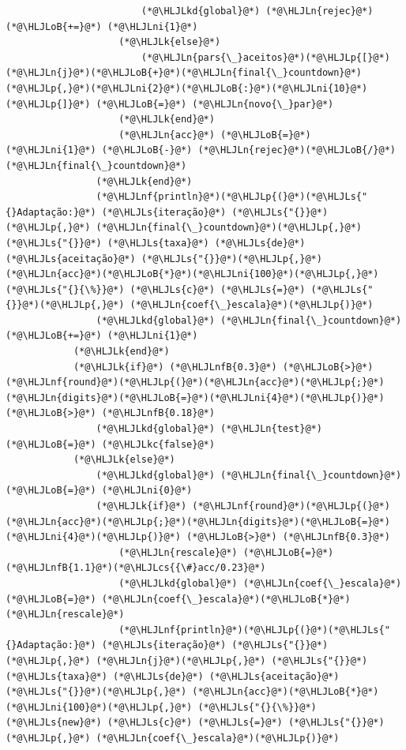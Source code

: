 \documentclass[12pt,a4paper]{article}
\newcommand{\HLJLk}[1]{\textcolor[RGB]{148,91,176}{\textbf{#1}}}
\newcommand{\HLJLkc}[1]{\textcolor[RGB]{59,151,46}{\textit{#1}}}
\newcommand{\HLJLkd}[1]{\textcolor[RGB]{214,102,97}{\textit{#1}}}
\newcommand{\HLJLn}[1]{#1}
\newcommand{\HLJLnf}[1]{\textcolor[RGB]{66,102,213}{#1}}
\newcommand{\HLJLs}[1]{\textcolor[RGB]{201,61,57}{#1}}
\newcommand{\HLJLnfB}[1]{\textcolor[RGB]{59,151,46}{#1}}
\newcommand{\HLJLni}[1]{\textcolor[RGB]{59,151,46}{#1}}
\newcommand{\HLJLoB}[1]{\textcolor[RGB]{102,102,102}{\textbf{#1}}}
\newcommand{\HLJLp}[1]{#1}
\newcommand{\HLJLcs}[1]{\textcolor[RGB]{153,153,119}{\textit{#1}}}
\begin{document}
\begin{lstlisting}
                        (*@\HLJLkd{global}@*) (*@\HLJLn{rejec}@*) (*@\HLJLoB{+=}@*) (*@\HLJLni{1}@*)
                    (*@\HLJLk{else}@*)
                        (*@\HLJLn{pars{\_}aceitos}@*)(*@\HLJLp{[}@*)(*@\HLJLn{j}@*)(*@\HLJLoB{+}@*)(*@\HLJLn{final{\_}countdown}@*)(*@\HLJLp{,}@*)(*@\HLJLni{2}@*)(*@\HLJLoB{:}@*)(*@\HLJLni{10}@*)(*@\HLJLp{]}@*) (*@\HLJLoB{=}@*) (*@\HLJLn{novo{\_}par}@*)
                    (*@\HLJLk{end}@*)
                    (*@\HLJLn{acc}@*) (*@\HLJLoB{=}@*) (*@\HLJLni{1}@*) (*@\HLJLoB{-}@*) (*@\HLJLn{rejec}@*)(*@\HLJLoB{/}@*)(*@\HLJLn{final{\_}countdown}@*)
                (*@\HLJLk{end}@*)
                (*@\HLJLnf{println}@*)(*@\HLJLp{(}@*)(*@\HLJLs{"{}Adaptação:}@*) (*@\HLJLs{iteração}@*) (*@\HLJLs{"{}}@*)(*@\HLJLp{,}@*) (*@\HLJLn{final{\_}countdown}@*)(*@\HLJLp{,}@*) (*@\HLJLs{"{}}@*) (*@\HLJLs{taxa}@*) (*@\HLJLs{de}@*) (*@\HLJLs{aceitação}@*) (*@\HLJLs{"{}}@*)(*@\HLJLp{,}@*) (*@\HLJLn{acc}@*)(*@\HLJLoB{*}@*)(*@\HLJLni{100}@*)(*@\HLJLp{,}@*) (*@\HLJLs{"{}{\%}}@*) (*@\HLJLs{c}@*) (*@\HLJLs{=}@*) (*@\HLJLs{"{}}@*)(*@\HLJLp{,}@*) (*@\HLJLn{coef{\_}escala}@*)(*@\HLJLp{)}@*)
                (*@\HLJLkd{global}@*) (*@\HLJLn{final{\_}countdown}@*) (*@\HLJLoB{+=}@*) (*@\HLJLni{1}@*)
            (*@\HLJLk{end}@*)
            (*@\HLJLk{if}@*) (*@\HLJLnfB{0.3}@*) (*@\HLJLoB{>}@*) (*@\HLJLnf{round}@*)(*@\HLJLp{(}@*)(*@\HLJLn{acc}@*)(*@\HLJLp{;}@*)(*@\HLJLn{digits}@*)(*@\HLJLoB{=}@*)(*@\HLJLni{4}@*)(*@\HLJLp{)}@*) (*@\HLJLoB{>}@*) (*@\HLJLnfB{0.18}@*)
                (*@\HLJLkd{global}@*) (*@\HLJLn{test}@*) (*@\HLJLoB{=}@*) (*@\HLJLkc{false}@*)
            (*@\HLJLk{else}@*)
                (*@\HLJLkd{global}@*) (*@\HLJLn{final{\_}countdown}@*) (*@\HLJLoB{=}@*) (*@\HLJLni{0}@*)
                (*@\HLJLk{if}@*) (*@\HLJLnf{round}@*)(*@\HLJLp{(}@*)(*@\HLJLn{acc}@*)(*@\HLJLp{;}@*)(*@\HLJLn{digits}@*)(*@\HLJLoB{=}@*)(*@\HLJLni{4}@*)(*@\HLJLp{)}@*) (*@\HLJLoB{>}@*) (*@\HLJLnfB{0.3}@*)
                    (*@\HLJLn{rescale}@*) (*@\HLJLoB{=}@*) (*@\HLJLnfB{1.1}@*)(*@\HLJLcs{{\#}acc/0.23}@*)
                    (*@\HLJLkd{global}@*) (*@\HLJLn{coef{\_}escala}@*) (*@\HLJLoB{=}@*) (*@\HLJLn{coef{\_}escala}@*)(*@\HLJLoB{*}@*)(*@\HLJLn{rescale}@*)
                    (*@\HLJLnf{println}@*)(*@\HLJLp{(}@*)(*@\HLJLs{"{}Adaptação:}@*) (*@\HLJLs{iteração}@*) (*@\HLJLs{"{}}@*)(*@\HLJLp{,}@*) (*@\HLJLn{j}@*)(*@\HLJLp{,}@*) (*@\HLJLs{"{}}@*) (*@\HLJLs{taxa}@*) (*@\HLJLs{de}@*) (*@\HLJLs{aceitação}@*) (*@\HLJLs{"{}}@*)(*@\HLJLp{,}@*) (*@\HLJLn{acc}@*)(*@\HLJLoB{*}@*)(*@\HLJLni{100}@*)(*@\HLJLp{,}@*) (*@\HLJLs{"{}{\%}}@*) (*@\HLJLs{new}@*) (*@\HLJLs{c}@*) (*@\HLJLs{=}@*) (*@\HLJLs{"{}}@*)(*@\HLJLp{,}@*) (*@\HLJLn{coef{\_}escala}@*)(*@\HLJLp{)}@*)

\end{lstlisting}
\end{document}
